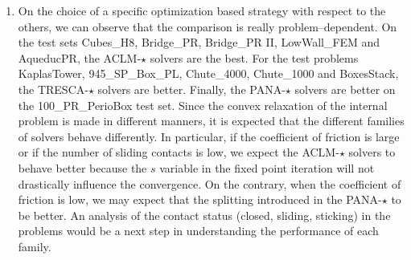 \begin{enumerate}
\item On the choice of a specific optimization based strategy with respect to the others, we can observe that the comparison is really problem--dependent. On the test sets Cubes\_H8, Bridge\_PR,  Bridge\_PR II, LowWall\_FEM and AqueducPR, the {\sf ACLM-$\star$} solvers are the best.  For the test problems KaplasTower, 945\_SP\_Box\_PL, Chute\_4000, Chute\_1000 and BoxesStack, the {\sf TRESCA-$\star$} solvers are better. Finally, the {\sf PANA-$\star$} solvers are better on the 100\_PR\_PerioBox test set. Since the convex relaxation of the internal problem is made in different manners, it is expected that the different families  of solvers behave differently. In particular, if the coefficient of friction is large or if the number of sliding contacts is low, we expect the {\sf ACLM-$\star$} solvers to behave better because the $s$ variable in the fixed point iteration will not drastically influence the convergence. On the contrary, when the coefficient of friction is low, we may expect that the splitting introduced in the {\sf PANA-$\star$} to be better. An analysis of the contact status (closed, sliding, sticking) in the problems would be a next step in understanding the performance of each family.
\end{enumerate}



